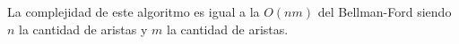La complejidad de este algoritmo es igual a la $O(nm)$ del Bellman-Ford siendo $n$ la cantidad de aristas y $m$ la cantidad de aristas.